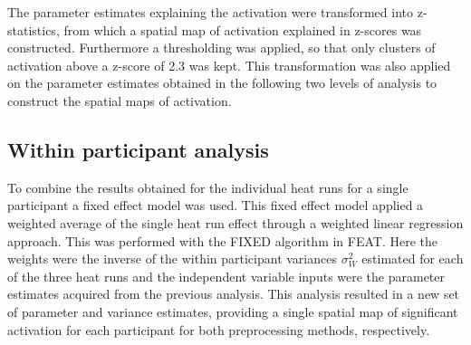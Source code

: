 The parameter estimates explaining the activation were transformed into z-statistics, from which a spatial map of activation explained in z-scores was constructed. Furthermore a thresholding was applied, so that only clusters of activation above a z-score of 2.3 was kept. This transformation was also applied on the parameter estimates obtained in the following two levels of analysis to construct the spatial maps of activation. 

\subsection{Within participant analysis}
To combine the results obtained for the individual heat runs for a single participant a fixed effect model was used. This fixed effect model applied a weighted average of the single heat run effect through a weighted linear regression approach. This was performed with the FIXED algorithm in FEAT. Here the weights were the inverse of the within participant variances $\sigma_{W}^{2}$ estimated for each of the three heat runs and the independent variable inputs were the parameter estimates acquired from the previous analysis. This analysis resulted in a new set of parameter and variance estimates, providing a single spatial map of significant activation for each participant for both preprocessing methods, respectively.


